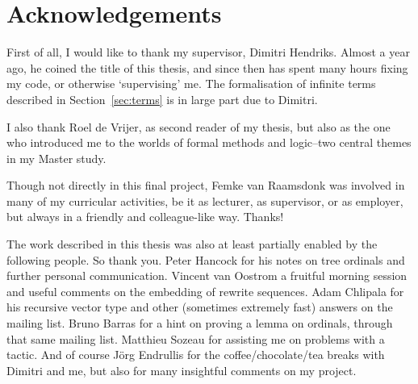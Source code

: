 \chapter*{Acknowledgements}
\thispagestyle{empty}

First of all, I would like to thank my supervisor, Dimitri
Hendriks. Almost a year ago, he coined the title of this thesis, and
since then has spent many hours fixing my \Coq code, or otherwise
`supervising' me. The formalisation of infinite terms described in
Section~\ref{sec:terms} is in large part due to Dimitri.

I also thank Roel de Vrijer, as second reader of my thesis, but also
as the one who introduced me to the worlds of formal methods and
logic--two central themes in my Master study.

Though not directly in this final project, Femke van Raamsdonk was
involved in many of my curricular activities, be it as lecturer, as
supervisor, or as employer, but always in a friendly and
colleague-like way. Thanks!

The work described in this thesis was also at least partially enabled
by the following people. So thank you. Peter Hancock for his notes on
tree ordinals and further personal communication. Vincent van Oostrom
a fruitful morning session and useful comments on the embedding of
rewrite sequences. Adam Chlipala for his recursive vector type and
other (sometimes extremely fast) answers on the \Coq mailing
list. Bruno Barras for a hint on proving a lemma on ordinals, through
that same mailing list. Matthieu Sozeau for assisting me on problems
with a \Coq tactic. And of course J\"org Endrullis for the
coffee/chocolate/tea breaks with Dimitri and me, but also for many insightful
comments on my project.

